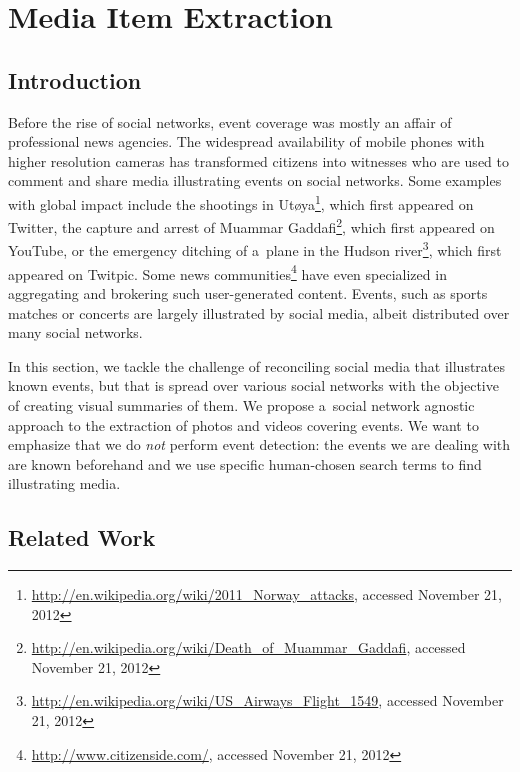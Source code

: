 \chapter{Media Item Extraction}
\label{cha:media-item-extraction}

\ifpdf
    \graphicspath{{5_media_item_extraction/figures/PNG/}{5_media_item_extraction/figures/PDF/}{5_media_item_extraction/figures/}}
\else
    \graphicspath{{5_media_item_extraction/figures/EPS/}{5_media_item_extraction/figures/}}
\fi

\section{Introduction}
\label{sec:introduction}

Before the rise of social networks,
event coverage was mostly an affair of professional news agencies.
The widespread availability of mobile phones
with higher resolution cameras has transformed
citizens into witnesses who are used to comment
and share media illustrating events on social networks.
Some examples with global impact
include the shootings in
Ut{\o}ya\footnote{\url{http://en.wikipedia.org/wiki/2011_Norway_attacks},
accessed November 21, 2012},
which first appeared on Twitter,
the capture and arrest of Muammar
Gaddafi\footnote{\url{http://en.wikipedia.org/wiki/Death_of_Muammar_Gaddafi},
accessed November 21, 2012},
which first appeared on YouTube,
or the emergency ditching of a~plane in the Hudson
river\footnote{\url{http://en.wikipedia.org/wiki/US_Airways_Flight_1549},
accessed November 21, 2012},
which first appeared on Twitpic.
Some news
communities\footnote{\url{http://www.citizenside.com/},
accessed November 21, 2012}
have even specialized in aggregating and brokering
such user-generated content.
Events, such as sports matches or concerts are 
largely illustrated by social media,
albeit distributed over many social networks.

In this section, we tackle the challenge of reconciling
social media that illustrates known events,
but that is spread over various social networks
with the objective of creating visual summaries of them.
We propose a~social network agnostic
approach to the extraction of photos and videos covering events.
We want to emphasize that we do \emph{not} perform event detection: 
the events we are dealing with are known beforehand
and we use specific human-chosen search terms
to find illustrating media.

\section{Related Work}
\label{sec:related-work}

